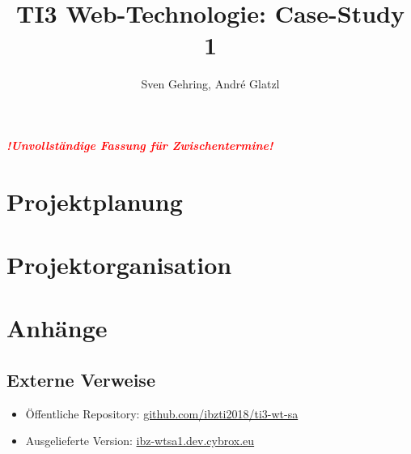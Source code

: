 \documentclass{article}
\begin{document}

\title{TI3 Web-Technologie: Case-Study 1}
\author{Sven Gehring, André Glatzl}
\date{}
\maketitle

\begin{abstract}

\end{abstract}

\vspace{3cm}
\begin{center}
  \textcolor{red}{\textbf{\emph{!Unvollständige Fassung für Zwischentermine!}}}
\end{center}

\clearpage
\tableofcontents

\clearpage
\section{Projektplanung}







\clearpage
\section{Projektorganisation}



\clearpage
\section{Anhänge}
\subsection{Externe Verweise}
\begin{itemize}
  \item Öffentliche Repository: \href{https://github.com/ibzti2018/ti3-wt-sa}{github.com/ibzti2018/ti3-wt-sa}
  \item Ausgelieferte Version: \href{https://ibz-wtsa1.dev.cybrox.eu/}{ibz-wtsa1.dev.cybrox.eu}
\end{itemize}
\end{document}
